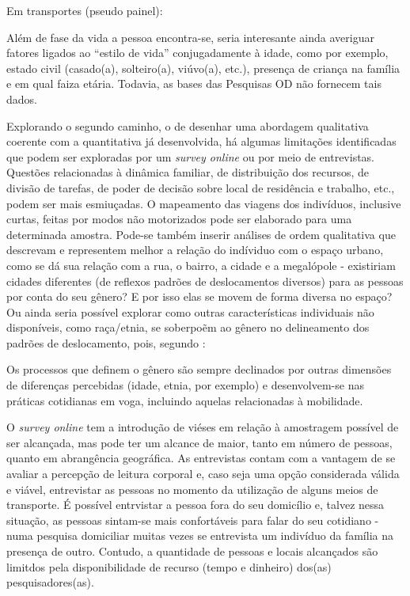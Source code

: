 Em transportes (pseudo painel): \cite{DARGAY1999,DARGAY2002,BRESSON2004}

Além de fase da vida a pessoa encontra-se, seria interesante ainda averiguar fatores ligados ao ``estilo de vida'' conjugadamente à idade, como por exemplo, estado civil (casado(a), solteiro(a), viúvo(a), etc.), presença de criança na família e em qual faiza etária. Todavia, as bases das Pesquisas OD não fornecem tais dados.



Explorando o segundo caminho, o de desenhar uma abordagem qualitativa coerente com a quantitativa já desenvolvida, há algumas limitações identificadas que podem ser exploradas por um \emph{survey online} ou por meio de entrevistas. Questões relacionadas à dinâmica familiar, de distribuição dos recursos, de divisão de tarefas, de poder de decisão sobre local de residência e trabalho, etc., podem ser mais esmiuçadas. O mapeamento das viagens dos indivíduos, inclusive curtas, feitas por modos não motorizados pode ser elaborado para uma determinada amostra. Pode-se também inserir análises de ordem qualitativa que descrevam e representem melhor a relação do indíviduo com o espaço urbano, como se dá sua relação com a rua, o bairro, a cidade e a megalópole - existiriam cidades diferentes (de reflexos padrões de deslocamentos diversos) para as pessoas por conta do seu gênero? E por isso elas se movem de forma diversa no espaço? Ou ainda seria possível explorar como outras características individuais não disponíveis, como raça/etnia, se soberpoẽm ao gênero no delineamento dos padrões de deslocamento, pois, segundo :

\begin{citacao}
Os processos que definem o gênero são sempre declinados  por outras dimensões de diferenças percebidas (idade, etnia, por exemplo) e desenvolvem-se nas práticas cotidianas em voga, incluindo aquelas relacionadas à mobilidade.
\end{citacao}

O \emph{survey online} tem a introdução de viéses em relação à amostragem possível de ser alcançada, mas pode ter um alcance de maior, tanto em número de pessoas, quanto em abrangência geográfica. 
As entrevistas contam com a vantagem de se avaliar a percepção de leitura corporal e, caso seja uma opção considerada válida e viável, entrevistar as pessoas no momento da utilização de alguns meios de transporte. 
É possível entrvistar a pessoa fora do seu domicílio e, talvez nessa situação, as pessoas sintam-se mais confortáveis para falar do seu cotidiano - numa pesquisa domiciliar muitas vezes se entrevista um indivíduo da família na presença de outro. Contudo, a quantidade de pessoas e locais alcançados são limitdos pela disponibilidade de recurso (tempo e dinheiro) dos(as) pesquisadores(as). 

